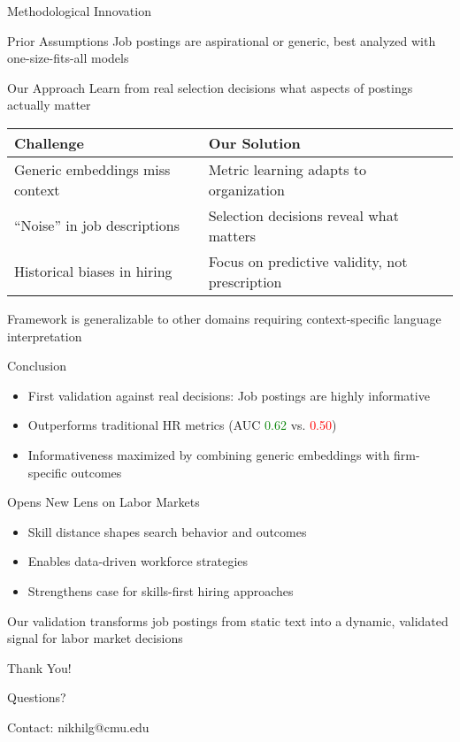 \documentclass{beamer}
\begin{document}
\begin{frame}{Methodological Innovation}
\begin{block}{Prior Assumptions}
Job postings are aspirational or generic, best analyzed with one-size-fits-all models
\end{block}

\begin{block}{Our Approach}
Learn from real selection decisions what aspects of postings actually matter
\end{block}

\begin{table}
\centering
\begin{tabular}{l l}
\toprule
\textbf{Challenge} & \textbf{Our Solution} \\
\midrule
Generic embeddings miss context & Metric learning adapts to organization \\
``Noise'' in job descriptions & Selection decisions reveal what matters \\
Historical biases in hiring & Focus on predictive validity, not prescription \\
\bottomrule
\end{tabular}
\end{table}

Framework is generalizable to other domains requiring context-specific language interpretation
\end{frame}

\begin{frame}{Conclusion}
\begin{itemize}
    \item First validation against real decisions: Job postings are highly informative
    \item Outperforms traditional HR metrics (AUC \textcolor{green}{0.62} vs. \textcolor{red}{0.50})
    \item Informativeness maximized by combining generic embeddings with firm-specific outcomes
\end{itemize}

\begin{block}{Opens New Lens on Labor Markets}
\begin{itemize}
    \item Skill distance shapes search behavior and outcomes
    \item Enables data-driven workforce strategies
    \item Strengthens case for skills-first hiring approaches
\end{itemize}
\end{block}

Our validation transforms job postings from static text into a dynamic, validated signal for labor market decisions
\end{frame}

\begin{frame}
\centering
\huge Thank You!

\vspace{2em}
\Large Questions?

\vspace{2em}
\normalsize Contact: nikhilg@cmu.edu
\end{frame}
\end{document}
